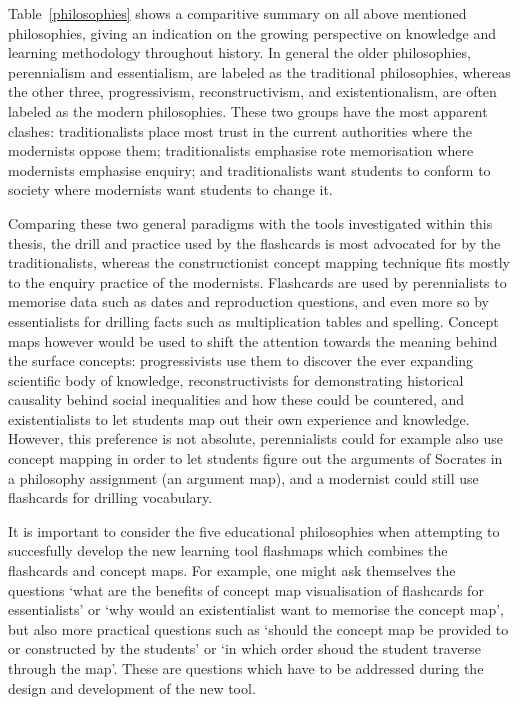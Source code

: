 Table~\ref{philosophies} shows a comparitive summary on all above mentioned philosophies, giving an indication on the growing perspective on knowledge and learning methodology throughout history. In general the older philosophies, perennialism and essentialism, are labeled as the traditional philosophies, whereas the other three, progressivism, reconstructivism, and existentionalism, are often labeled as the modern philosophies. These two groups have the most apparent clashes: traditionalists place most trust in the current authorities where the modernists oppose them; traditionalists emphasise rote memorisation where modernists emphasise enquiry; and traditionalists want students to conform to society where modernists want students to change it.

Comparing these two general paradigms with the tools investigated within this thesis, the drill and practice used by the flashcards is most advocated for by the traditionalists, whereas the constructionist concept mapping technique fits mostly to the enquiry practice of the modernists. Flashcards are used by perennialists to memorise data such as dates and reproduction questions, and even more so by essentialists for drilling facts such as multiplication tables and spelling. Concept maps however would be used to shift the attention towards the meaning behind the surface concepts: progressivists use them to discover the ever expanding scientific body of knowledge, reconstructivists for demonstrating historical causality behind social inequalities and how these could be countered, and existentialists to let students map out their own experience and knowledge. However, this preference is not absolute, perennialists could for example also use concept mapping in order to let students figure out the arguments of Socrates in a philosophy assignment (an argument map), and a modernist could still use flashcards for drilling vocabulary.

It is important to consider the five educational philosophies when attempting to succesfully develop the new learning tool flashmaps which combines the flashcards and concept maps. For example, one might ask themselves the questions `what are the benefits of concept map visualisation of flashcards for essentialists' or `why would an existentialist want to memorise the concept map', but also more practical questions such as `should the concept map be provided to or constructed by the students' or `in which order shoud the student traverse through the map'. These are questions which have to be addressed during the design and development of the new tool.
